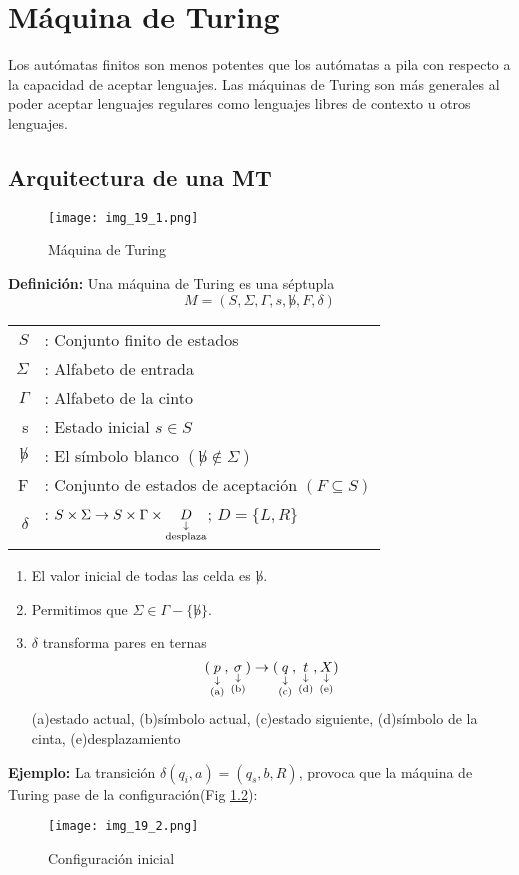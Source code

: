 \chapter{Máquina de Turing}
Los autómatas finitos son menos potentes que los autómatas a pila con respecto a la capacidad de aceptar lenguajes. Las máquinas de Turing son más generales al poder aceptar lenguajes regulares como lenguajes libres de contexto u otros lenguajes.

\section{Arquitectura de una MT}
\begin{figure}[h!]
\centering
\texttt{[image: img\_19\_1.png]}
\caption{Máquina de Turing}\label{img_19_1}
\end{figure}

\textbf{Definición: }Una máquina de Turing es una séptupla
$$M=(S,\Sigma,\Gamma,s,\not b, F,\delta)$$
\begin{tabular}{rl}
$S$			&	: Conjunto finito de estados	\\
$\Sigma$	&	: Alfabeto de entrada	\\
$\Gamma$	&	: Alfabeto de la cinto	\\
s			&	: Estado inicial $s\in S$	\\
$\not b$	&	: El símbolo blanco $(\not b \not\in\Sigma )$	\\
F			&	: Conjunto de estados de aceptación $(F\subseteq S)$	\\
$\delta$	&	: $S\times\Sigma\rightarrow S\times\Gamma\times \downlegend{D}{desplaza}$; $D=\{L,R\}$
\end{tabular}

\begin{enumerate}
\item El valor inicial de todas las celda es $\not b$.
\item Permitimos que $\Sigma \in \Gamma -\{\not b\}$.
\item $\delta$ transforma pares en ternas
$$(\downlegend{p}{(a)},\downlegend{\sigma}{(b)})\rightarrow (\downlegend{q}{(c)},\downlegend{t}{(d)},\downlegend{X}{(e)})$$
(a)estado actual, (b)símbolo actual, (c)estado siguiente, (d)símbolo de la cinta, (e)desplazamiento
\end{enumerate}

\textbf{Ejemplo: }La transición $\delta(q_i,a)=(q_s,b,R)$, provoca que la máquina de Turing pase de la configuración(Fig \ref{img_19_2}):
\begin{figure}[h!]
\centering
\texttt{[image: img\_19\_2.png]}
\caption{Configuración inicial}\label{img_19_2}
\end{figure}

